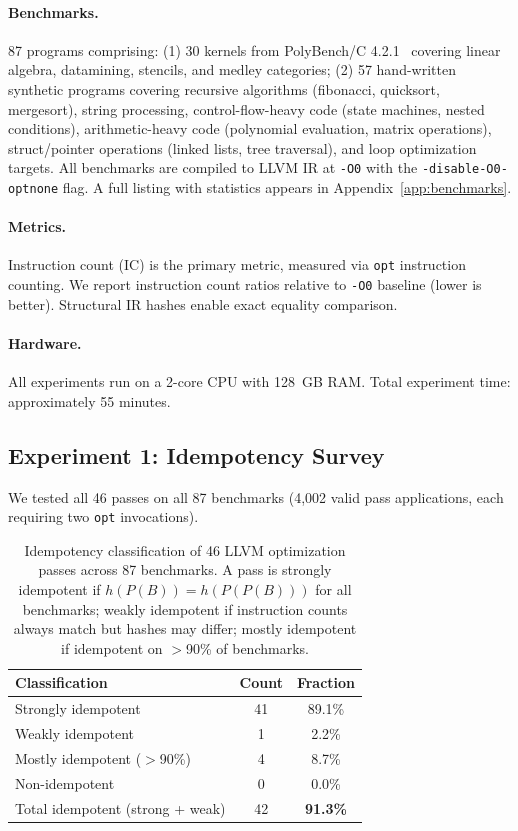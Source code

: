 \documentclass[11pt]{article}
\begin{document}
\paragraph{Benchmarks.} 87 programs comprising: (1) 30 kernels from PolyBench/C 4.2.1~\citep{pouchet2012polybench} covering linear algebra, datamining, stencils, and medley categories; (2) 57 hand-written synthetic programs covering recursive algorithms (fibonacci, quicksort, mergesort), string processing, control-flow-heavy code (state machines, nested conditions), arithmetic-heavy code (polynomial evaluation, matrix operations), struct/pointer operations (linked lists, tree traversal), and loop optimization targets. All benchmarks are compiled to LLVM IR at \texttt{-O0} with the \texttt{-disable-O0-optnone} flag. A full listing with statistics appears in Appendix~\ref{app:benchmarks}.

\paragraph{Metrics.} Instruction count (IC) is the primary metric, measured via \texttt{opt} instruction counting. We report instruction count ratios relative to \texttt{-O0} baseline (lower is better). Structural IR hashes enable exact equality comparison.

\paragraph{Hardware.} All experiments run on a 2-core CPU with 128~GB RAM. Total experiment time: approximately 55 minutes.

\subsection{Experiment 1: Idempotency Survey}

We tested all 46 passes on all 87 benchmarks (4,002 valid pass applications, each requiring two \texttt{opt} invocations).

\begin{table}[t]
\centering
\caption{Idempotency classification of 46 LLVM optimization passes across 87 benchmarks. A pass is strongly idempotent if $h(P(B)) = h(P(P(B)))$ for all benchmarks; weakly idempotent if instruction counts always match but hashes may differ; mostly idempotent if idempotent on $>$90\% of benchmarks.}
\label{tab:idempotency}
\begin{tabular}{lcc}
\toprule
\textbf{Classification} & \textbf{Count} & \textbf{Fraction} \\
\midrule
Strongly idempotent & 41 & 89.1\% \\
Weakly idempotent & 1 & 2.2\% \\
Mostly idempotent ($>$90\%) & 4 & 8.7\% \\
Non-idempotent & 0 & 0.0\% \\
\midrule
Total idempotent (strong + weak) & 42 & \textbf{91.3\%} \\
\bottomrule
\end{tabular}
\end{table}
\end{document}
